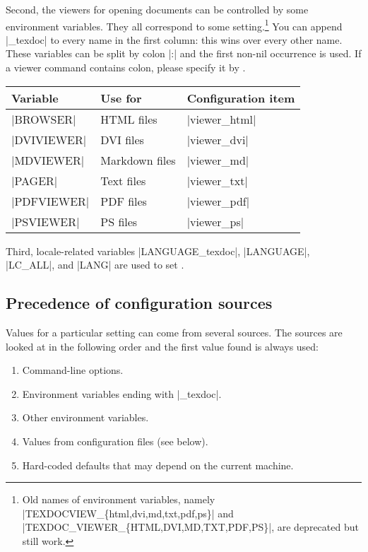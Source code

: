 \documentclass{texdoc-doc}
\begin{document}
Second, the viewers for opening documents can be controlled by some environment
variables. They all correspond to some 
setting.\footnote{Old names of environment variables, namely
|TEXDOCVIEW_\{html,dvi,md,txt,pdf,ps\}| and
|TEXDOC_VIEWER_\{HTML,DVI,MD,TXT,PDF,PS\}|, are deprecated but still work.} You
can append |_texdoc| to every name in the first column: this wins over every
other name. These variables can be split by colon |:| and the first non-nil
occurrence is used. If a viewer command contains colon, please specify it by
.
%
\begin{center}
\begin{tabular}{lll}
Variable & Use for & Configuration item \\ \hline
|BROWSER| & HTML files & |viewer_html| \\
|DVIVIEWER| & DVI files & |viewer_dvi| \\
|MDVIEWER| & Markdown files & |viewer_md| \\
|PAGER| & Text files & |viewer_txt| \\
|PDFVIEWER| & PDF files & |viewer_pdf| \\
|PSVIEWER| & PS files & |viewer_ps| \\
\end{tabular}
\end{center}

Third, locale-related variables |LANGUAGE_texdoc|, |LANGUAGE|, |LC_ALL|, and
|LANG| are used to set .

\subsection{Precedence of configuration sources}
\label{sec:prec}

Values for a particular setting can come from several sources. The sources are
looked at in the following order and the first value found is always used:
%
\begin{enumerate}
\item Command-line options.
\item Environment variables ending with |_texdoc|.
\item Other environment variables.
\item Values from configuration files (see below).
\item Hard-coded defaults that may depend on the current machine.
\end{enumerate}
\end{document}
